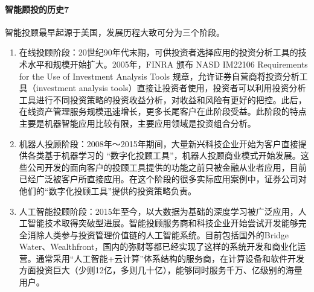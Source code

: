 \documentclass[letterpaper,10pt,english]{sphinxmanual}
\begin{document}
\paragraph{智能顾投的历史7\sphinxfootnotemark[1106]}
\label{\detokenize{chapter_AI+Finance/Robo-Advisor:id4}}%
\begin{footnotetext}[1106]\sphinxAtStartFootnote
{}
%
\end{footnotetext}\ignorespaces 
智能投顾最早起源于美国，发展历程大致可分为三个阶段。
\begin{enumerate}
%
\item {} 
在线投顾阶段：20世纪90年代末期，可供投资者选择应用的投资分析工具的技术水平和规模开始扩大。2005年，FINRA
颁布 NASD IM2210\sphinxhyphen{}6 Requirements for the Use of Investment Analysis
Tools 规章，允许证券自营商将投资分析工具（investment analysis
tools）直接让投资者使用，投资者可以利用投资分析工具进行不同投资策略的投资收益分析，对收益和风险有更好的把控。此后，在线资产管理服务规模迅速增长，更多长尾客户在此阶段受益。此阶段的特点主要是机器智能应用比较有限，主要应用领域是投资组合分析。

\item {} 
机器人投顾阶段：2008年～2015年期间，大量新兴科技企业开始为客户直接提供各类基于机器学习的
“数字化投顾工具”，机器人投顾商业模式开始发展。这些公司开发的面向客户的投顾工具提供的功能之前只被金融从业者应用，目前已经广泛被客户所直接应用。在这个阶段的很多实际应用案例中，证券公司对他们的“数字化投顾工具”提供的投资策略负责。

\item {} 
人工智能投顾阶段：2015年至今，以大数据为基础的深度学习被广泛应用，人工智能技术取得突破型进展。智能投顾服务商和科技企业开始尝试开发能够完全消除人类参与投资管理价值链的人工智能系统。目前包括国外的Bridge
Water、Wealthfront，国内的弥财等都已经实现了这样的系统开发和商业化运营。通常采用“人工智能+云计算”体系结构的服务商，在计算设备和软件开发方面投资巨大（少则1\sphinxhyphen{}2亿，多则几十亿），能够同时服务千万、亿级别的海量用户。%
\begin{footnote}[1107]\sphinxAtStartFootnote
{}
%
\end{footnote}

\end{enumerate}
\end{document}
